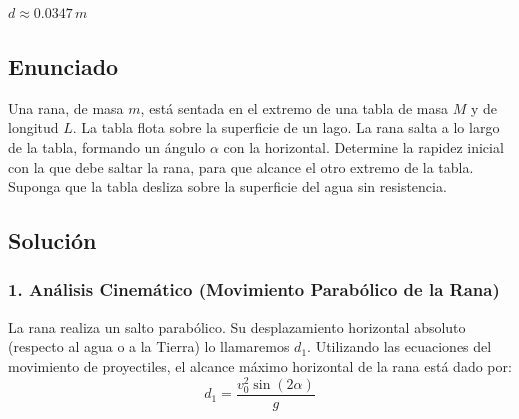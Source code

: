 \documentclass[12pt, a4paper]{article}
\begin{document}
\begin{tcolorbox}[colback=green!5!white, colframe=green!50!black, title=Respuesta Final]
\centering \Large $d \approx 0.0347 \, \si{m}$
\end{tcolorbox}

\newpage

\subsection*{Enunciado}
Una rana, de masa $m$, está sentada en el extremo de una tabla de masa $M$ y de longitud $L$. La tabla flota sobre la superficie de un lago. La rana salta a lo largo de la tabla, formando un ángulo $\alpha$ con la horizontal. Determine la rapidez inicial con la que debe saltar la rana, para que alcance el otro extremo de la tabla. Suponga que la tabla desliza sobre la superficie del agua sin resistencia.

\begin{center}
\end{center}

\subsection*{Solución}

\subsubsection*{1. Análisis Cinemático (Movimiento Parabólico de la Rana)}
La rana realiza un salto parabólico. Su desplazamiento horizontal absoluto (respecto al agua o a la Tierra) lo llamaremos $d_1$. Utilizando las ecuaciones del movimiento de proyectiles, el alcance máximo horizontal de la rana está dado por:
$$d_1 = \frac{v_0^2 \sin(2\alpha)}{g}$$
\end{document}
